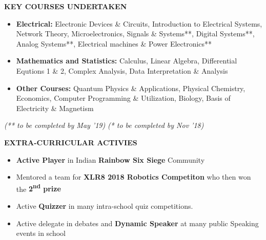 \documentclass[11pt]{article}%
\begin{document}
\begin{flushleft}
\bf{\LARGE{K}\Large{EY} \LARGE{C}\Large{OURSES} \LARGE{U}\Large{NDERTAKEN}}
\end{flushleft}
\vspace{-7mm}
\hrulefill
\vspace{-3mm}
\begin{itemize}
\setlength\itemsep{0.01em}
\item \textbf{Electrical:} \nohyphens{Electronic Devices \& Circuits, Introduction to Electrical Systems, Network Theory, Microelectronics, Signals \& Systems**, Digital Systems**, Analog Systems**, Electrical machines \& Power Electronics**}
\vspace{-1.2mm}
\item \textbf{Mathematics and Statistics:} \nohyphens{Calculus, Linear Algebra, Differential Equtions 1 \& 2, Complex Analysis, Data Interpretation \& Analysis}
\vspace{-1.2mm}
\item \textbf{Other Courses:} \nohyphens{Quantum Physics \& Applications, Physical Chemistry, Economics, Computer Programming \& Utilization, Biology, Basis of Electricity \& Magnetism}
\end{itemize}
\vspace{-4mm}
\hfill {{{\em{(** to be completed by May '19)}}}} {{{\em{(* to be completed by Nov '18)}}}}
\hfill 
\begin{flushleft}
\bf{\LARGE{E}\Large{XTRA-}\LARGE{C}\Large{URRICULAR} \LARGE{A}\Large{CTIVIES}}
\end{flushleft}
\vspace{-6mm}
\hrulefill
\vspace{-1mm}
\begin{itemize}
    \vspace{-2mm}
    \item {\bf Active Player} in Indian {\bf Rainbow Six Siege}  Community
    \vspace{-3mm}
    \item Mentored a team for {\bf XLR8 2018 Robotics Competiton} who then won the {\bf 2\textsuperscript{nd} prize} 
    \vspace{-3mm}
    \item Active {\bf Quizzer} in many intra-school quiz competitions.
    \vspace{-3mm}
    \item Active delegate in debates and \textbf{Dynamic Speaker} at many public Speaking events in school
\end{itemize}
\end{document}

